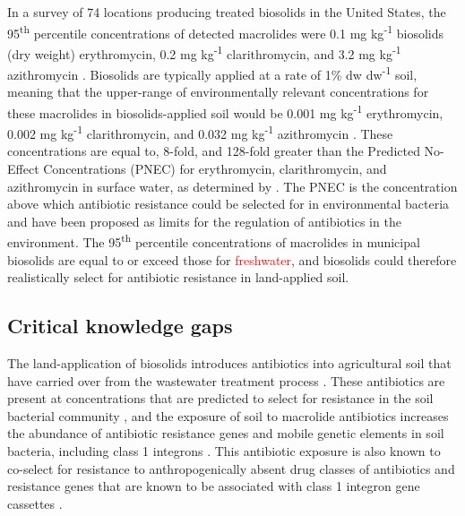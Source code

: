 In a survey of 74 locations producing treated biosolids in the United States, the 95\textsuperscript{th} percentile concentrations of detected macrolides were 0.1 mg kg\textsuperscript{-1} biosolids (dry weight) erythromycin, 0.2 mg kg\textsuperscript{-1} clarithromycin, and 3.2 mg kg\textsuperscript{-1} azithromycin \parencite{U.S.EnvironmentalProtectionAgency.2021}.
Biosolids are typically applied at a rate of 1\% dw dw\textsuperscript{-1} soil, meaning that the upper-range of environmentally relevant concentrations for these macrolides in biosolids-applied soil would be 0.001 mg kg\textsuperscript{-1} erythromycin, 0.002 mg kg\textsuperscript{-1} clarithromycin, and 0.032 mg kg\textsuperscript{-1} azithromycin \parencite{Sidhu.2021}.
These concentrations are equal to, 8-fold, and 128-fold greater than the Predicted No-Effect Concentrations (PNEC) for erythromycin, clarithromycin, and azithromycin in surface water, as determined by \cite{BengtssonPalme.2016}.
The PNEC is the concentration above which antibiotic resistance could be selected for in environmental bacteria and have been proposed as limits for the regulation of antibiotics in the environment.
The 95\textsuperscript{th} percentile concentrations of macrolides in municipal biosolids are equal to or exceed those for \textcolor{red}{freshwater}, and biosolids could therefore realistically select for antibiotic resistance in land-applied soil.


\subsection{Critical knowledge gaps}

The land-application of biosolids introduces antibiotics into agricultural soil that have carried over from the wastewater treatment process \parencite{McClellan.2010, Sabourin.2012}.
These antibiotics are present at concentrations that are predicted to select for resistance in the soil bacterial community \parencite{U.S.EnvironmentalProtectionAgency.2021, BengtssonPalme.2016}, and the exposure of soil to macrolide antibiotics increases the abundance of antibiotic resistance genes and mobile genetic elements in soil bacteria, including class 1 integrons \parencite{Lau.2020}.
This antibiotic exposure is also known to co-select for resistance to anthropogenically absent drug classes of antibiotics and resistance genes that are known to be associated with class 1 integron gene cassettes \parencite{Lau.2020}.

